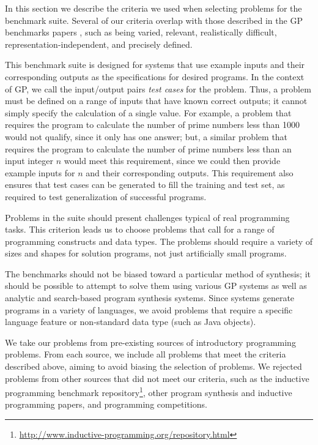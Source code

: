 \documentclass{sig-alternate}
\begin{document}
In this section we describe the criteria we used when selecting problems for the benchmark suite. Several of our criteria overlap with those described in the GP benchmarks papers \cite{McDermott:2012:GECCO, White:2013:BGB:2441218.2441242}, such as being varied, relevant, realistically difficult, representation-independent, and precisely defined. 

This benchmark suite is designed for systems that use example inputs and their corresponding outputs as the specifications for desired programs. In the context of GP, we call the input/output pairs \textit{test cases} for the problem. Thus, a problem must be defined on a range of inputs that have known correct outputs; it cannot simply specify the calculation of a single value. For example, a problem that requires the program to calculate the number of prime numbers less than 1000 would not qualify, since it only has one answer; but, a similar problem that requires the program to calculate the number of prime numbers less than an input integer $n$ would meet this requirement, since we could then provide example inputs for $n$ and their corresponding outputs. This requirement also ensures that test cases can be generated to fill the training and test set, as required to test generalization of successful programs.

Problems in the suite should present challenges typical of real programming tasks. 
This criterion leads us to choose problems that call for a range of programming constructs and data types. The problems should require a variety of sizes and shapes for solution programs, not just artificially small programs. 

The benchmarks should not be biased toward a particular method of synthesis; it should be possible to attempt to solve them using various GP systems as well as analytic and search-based program synthesis systems. Since systems generate programs in a variety of languages, we avoid problems that require a specific language feature or non-standard data type (such as Java objects).

We take our problems from pre-existing sources of introductory programming problems. From each source, we include all problems that meet the criteria described above, aiming to avoid biasing the selection of problems. We rejected problems from other sources that did not meet our criteria, such as the inductive programming benchmark repository\footnote{\url{http://www.inductive-programming.org/repository.html}}, other program synthesis and inductive programming papers, and programming competitions.
\end{document}
